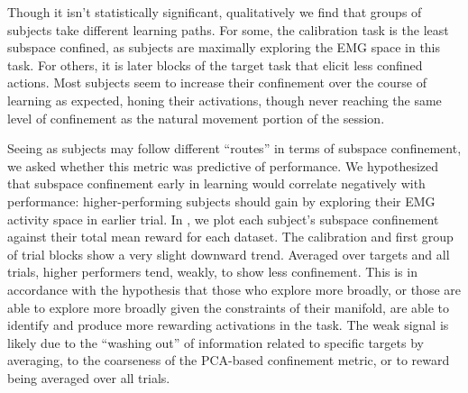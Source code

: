 \documentclass[../main.tex]{subfiles}
\begin{document}
Though it isn't statistically significant, qualitatively we find that groups of subjects take different learning paths. For some, the calibration task is the least subspace confined, as subjects are maximally exploring the EMG space in this task. For others, it is later blocks of the target task that elicit less confined actions. Most subjects seem to increase their confinement over the course of learning as expected, honing their activations, though never reaching the same level of confinement as the natural movement portion of the session. 

Seeing as subjects may follow different ``routes'' in terms of subspace confinement, we asked whether this metric was predictive of performance. We hypothesized that subspace confinement early in learning would correlate negatively with performance: higher-performing subjects should gain by exploring their EMG activity space in earlier trial. In , we plot each subject's subspace confinement against their total mean reward for each dataset. The calibration and first group of trial blocks show a very slight downward trend. Averaged over targets and all trials, higher performers tend, weakly, to show less confinement. This is in accordance with the hypothesis that those who explore more broadly, or those are able to explore more broadly given the constraints of their manifold, are able to identify and produce more rewarding activations in the task. The weak signal is likely due to the ``washing out'' of information related to specific targets by averaging, to the coarseness of the PCA-based confinement metric, or to reward being averaged over all trials.


\end{document}
